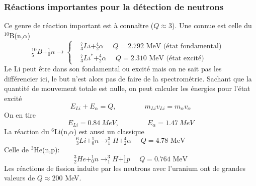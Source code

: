 \subsubsection{Réactions importantes pour la détection de neutrons} 
Ce genre de réaction important est à connaître ($Q\approx3$). Une connue est celle du 
$^{10}$B(n,$\alpha$)
\begin{equation}
^{10}_5B+^1_0n \rightarrow \left\{
\begin{aligned}
   &^7_3Li+^4_2\alpha {\mbox{~~~~$Q=2.792$ MeV (\'etat fondamental)}}\\
   &^7_3Li^*+^4_2\alpha  {\mbox{~~~~$Q=2.310$ MeV (\'etat excit\'e)}}& 
\end{aligned} 
\right.
\end{equation}
Le Li peut être dans son fondamental ou excité mais on ne sait pas les différencier ici, le but n'est
alors pas de faire de la spectrométrie. Sachant que la quantité de mouvement totale est nulle, on 
peut calculer les énergies pour l'état excité
\begin{equation}
E_{Li}+E_\alpha=Q,\qquad\qquad
m_{Li}v_{Li}=m_\alpha v_\alpha
\end{equation}
On en tire
\begin{equation}
E_{Li} =0.84\ MeV,\qquad\qquad E_\alpha = 1.47\ MeV
\end{equation}
La réaction du $^6$Li(n,$\alpha$) est aussi un classique
\begin{equation}
^{6}_3Li+^1_0n \rightarrow
   ^3_1H+^4_2\alpha  {\mbox{~~~~$Q=4.78$ MeV}}
\end{equation}
Celle de $^3$He(n,p):
\begin{equation}
^{3}_2He+^1_0n \rightarrow
   ^3_1H+^1_1p  {\mbox{~~~~$Q=0.764$ MeV}}
\end{equation}
Les réactions de fission induite par les neutrons avec l'uranium ont de grandes valeurs de
$Q\approx200$ MeV.

